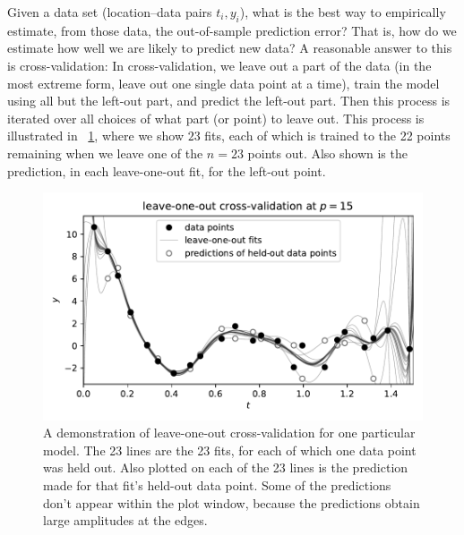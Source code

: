 \documentclass[12pt,letterpaper]{article}
\newlength{\figurewidth}
\begin{document}
Given a data set (location--data pairs $t_i, y_i$), what is the best way to empirically estimate, from those data, the out-of-sample prediction error?
That is, how do we estimate how well we are likely to predict new data?
A reasonable answer to this is cross-validation:
In cross-validation, we leave out a part of the data (in the most extreme form, leave out one single data point at a time), train the model using all but the left-out part, and predict the left-out part. Then this process is iterated over all choices of what part (or point) to leave out.
This process is illustrated in \figurename~\ref{fig:loo}, where we show $23$ fits, each of which is trained to the 22 points remaining when we leave one of the $n=23$ points out.
Also shown is the prediction, in each leave-one-out fit, for the left-out point.
\begin{figure}[t]
    \begin{mdframed}
    \includegraphics[width=\figurewidth]{./LOO.pdf}
    \caption{A demonstration of leave-one-out cross-validation for one particular model. The 23 lines are the 23 fits, for each of which one data point was held out. Also plotted on each of the 23 lines is the prediction made for that fit's held-out data point. Some of the predictions don't appear within the plot window, because the predictions obtain large amplitudes at the edges.}
    \label{fig:loo}
    \end{mdframed}
\end{figure}
\end{document}
